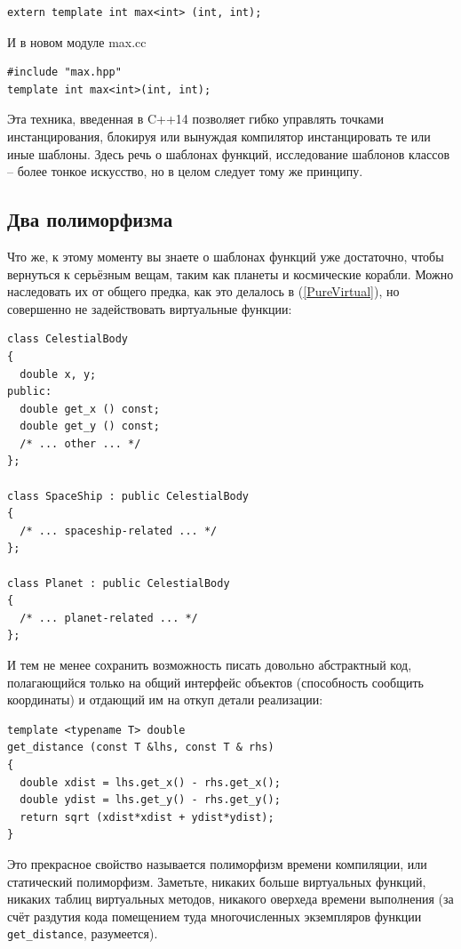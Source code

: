 \documentclass[a4paper,12pt,oneside]{book}
\begin{document}
\begin{lstlisting}
extern template int max<int> (int, int);
\end{lstlisting}

И в новом модуле max.cc

\begin{lstlisting}
#include "max.hpp"
template int max<int>(int, int);
\end{lstlisting}

Эта техника, введенная в C++14 позволяет гибко управлять точками инстанцирования, блокируя или вынуждая компилятор инстанцировать те или иные шаблоны. Здесь речь о шаблонах функций, исследование шаблонов классов -- более тонкое искусство, но в целом следует тому же принципу.

\subsection{Два полиморфизма}\label{TemplatePolymorphism}

Что же, к этому моменту вы знаете о шаблонах функций уже достаточно, чтобы вернуться к серьёзным вещам, таким как планеты и космические корабли. Можно наследовать их от общего предка, как это делалось в (\ref{PureVirtual}), но совершенно не задействовать виртуальные функции:

\begin{lstlisting}
class CelestialBody
{
  double x, y;
public:
  double get_x () const;
  double get_y () const;
  /* ... other ... */ 
};

class SpaceShip : public CelestialBody
{
  /* ... spaceship-related ... */
};

class Planet : public CelestialBody
{
  /* ... planet-related ... */
};
\end{lstlisting}

И тем не менее сохранить возможность писать довольно абстрактный код, полагающийся только на общий интерфейс объектов (способность сообщить координаты) и отдающий им на откуп детали реализации:

\begin{lstlisting}
template <typename T> double
get_distance (const T &lhs, const T & rhs)
{
  double xdist = lhs.get_x() - rhs.get_x();
  double ydist = lhs.get_y() - rhs.get_y();
  return sqrt (xdist*xdist + ydist*ydist);
}
\end{lstlisting}

Это прекрасное свойство называется полиморфизм времени компиляции, или статический полиморфизм. Заметьте, никаких больше виртуальных функций, никаких таблиц виртуальных методов, никакого оверхеда времени выполнения (за счёт раздутия кода помещением туда многочисленных экземпляров функции \lstinline!get_distance!, разумеется).
\end{document}
